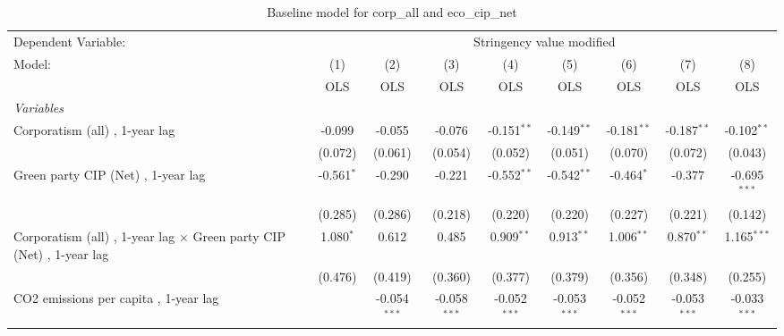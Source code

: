 
\begin{table}[htbp]
   \caption{Baseline model for corp\_all and eco\_cip\_net}
   \centering
   \begin{tabular}{lcccccccc}
      \toprule
      Dependent Variable: & \multicolumn{8}{c}{Stringency value modified}\\
      Model:                                                                      & (1)          & (2)            & (3)            & (4)            & (5)            & (6)            & (7)            & (8)\\  
                                                                                  &  OLS         & OLS            & OLS            & OLS            & OLS            & OLS            & OLS            & OLS\\  
      \midrule
      \emph{Variables}\\
      Corporatism (all) , 1-year lag                                              & -0.099       & -0.055         & -0.076         & -0.151$^{**}$  & -0.149$^{**}$  & -0.181$^{**}$  & -0.187$^{**}$  & -0.102$^{**}$\\   
                                                                                  & (0.072)      & (0.061)        & (0.054)        & (0.052)        & (0.051)        & (0.070)        & (0.072)        & (0.043)\\   
      Green party CIP (Net) , 1-year lag                                          & -0.561$^{*}$ & -0.290         & -0.221         & -0.552$^{**}$  & -0.542$^{**}$  & -0.464$^{*}$   & -0.377         & -0.695$^{***}$\\   
                                                                                  & (0.285)      & (0.286)        & (0.218)        & (0.220)        & (0.220)        & (0.227)        & (0.221)        & (0.142)\\   
      Corporatism (all) , 1-year lag $\times$ Green party CIP (Net) , 1-year lag  & 1.080$^{*}$  & 0.612          & 0.485          & 0.909$^{**}$   & 0.913$^{**}$   & 1.006$^{**}$   & 0.870$^{**}$   & 1.165$^{***}$\\   
                                                                                  & (0.476)      & (0.419)        & (0.360)        & (0.377)        & (0.379)        & (0.356)        & (0.348)        & (0.255)\\   
      CO2 emissions per capita , 1-year lag                                       &              & -0.054$^{***}$ & -0.058$^{***}$ & -0.052$^{***}$ & -0.053$^{***}$ & -0.052$^{***}$ & -0.053$^{***}$ & -0.033$^{***}$\\   

\end{tabular}
\end{table}
